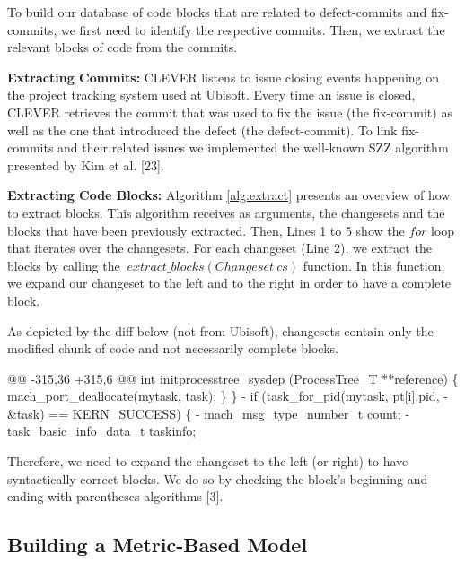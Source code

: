 \documentclass[sigconf]{acmart}
\newenvironment{Shaded}{}{}
\newcommand{\DataTypeTok}[1]{\textcolor[rgb]{0.56,0.13,0.00}{{#1}}}
\newcommand{\StringTok}[1]{\textcolor[rgb]{0.25,0.44,0.63}{{#1}}}
\newcommand{\NormalTok}[1]{{#1}}
\begin{document}
To build our database of code blocks that are related to defect-commits
and fix-commits, we first need to identify the respective commits. Then,
we extract the relevant blocks of code from the commits.

\textbf{Extracting Commits:} CLEVER listens to issue closing events
happening on the project tracking system used at Ubisoft. Every time an
issue is closed, CLEVER retrieves the commit that was used to fix the
issue (the fix-commit) as well as the one that introduced the defect
(the defect-commit). To link fix-commits and their related issues we
implemented the well-known SZZ algorithm presented by Kim et al.
{[}23{]}.

\textbf{Extracting Code Blocks:} Algorithm \ref{alg:extract} presents an
overview of how to extract blocks. This algorithm receives as arguments,
the changesets and the blocks that have been previously extracted. Then,
Lines 1 to 5 show the \(for\) loop that iterates over the changesets.
For each changeset (Line 2), we extract the blocks by calling the
\(~extract\_blocks(Changeset~cs)\) function. In this function, we expand
our changeset to the left and to the right in order to have a complete
block.



As depicted by the diff below (not from Ubisoft), changesets contain
only the modified chunk of code and not necessarily complete blocks.

\begin{Shaded}
\begin{Highlighting}[]
\DataTypeTok{@@ -315,36 +315,6 @@}
\NormalTok{int initprocesstree_sysdep}
\NormalTok{(ProcessTree_T **reference) \{}
    \NormalTok{mach_port_deallocate(mytask,}
      \NormalTok{task);}
\NormalTok{\}}
\NormalTok{\}}
\StringTok{- if (task_for_pid(mytask, pt[i].pid,}
\StringTok{-  &task) == KERN_SUCCESS) \{}
\StringTok{-   mach_msg_type_number_t   count;}
\StringTok{-   task_basic_info_data_t   taskinfo;}
\end{Highlighting}
\end{Shaded}

Therefore, we need to expand the changeset to the left (or right) to
have syntactically correct blocks. We do so by checking the block's
beginning and ending with parentheses algorithms {[}3{]}.

\subsection{Building a Metric-Based Model}\label{sec:metric-based}
\end{document}
